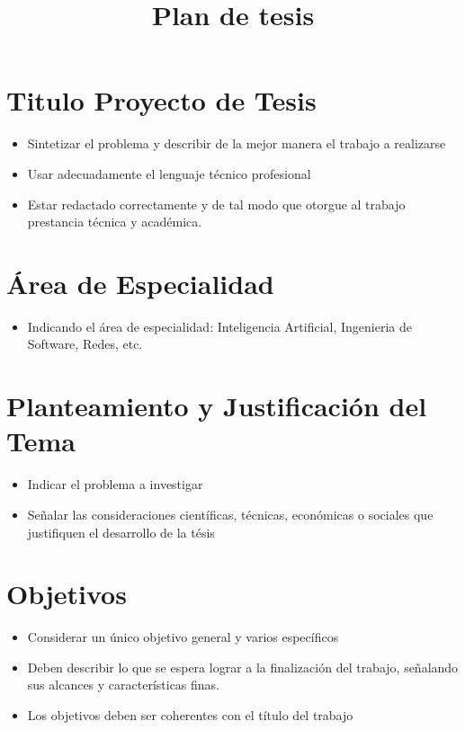 \documentclass[a4paper,11pt]{article}
\title{Plan de tesis}
\begin{document}
 
 \maketitle
 
 \section{Titulo Proyecto de Tesis}
\begin{itemize}
	\item Sintetizar el problema y describir de la mejor manera el trabajo a realizarse
	\item Usar adecuadamente el lenguaje técnico profesional
	\item Estar redactado correctamente y de tal modo que otorgue al trabajo prestancia técnica y académica.
\end{itemize}

 \section{Área de Especialidad}

\begin{itemize}
	\item Indicando el área de especialidad: Inteligencia Artificial, Ingenieria de Software, Redes, etc.
\end{itemize}
 
 \section{Planteamiento y Justificación del Tema}
\begin{itemize}
	\item Indicar el problema a investigar
	\item Señalar las consideraciones científicas, técnicas, económicas o sociales que justifiquen el desarrollo de la tésis
\end{itemize}
  
 \section{Objetivos}
\begin{itemize}
	\item Considerar un único objetivo general  y varios específicos 
	\item Deben describir lo que se espera lograr a la finalización del trabajo, señalando sus alcances y características finas.
	\item Los objetivos deben ser coherentes con el título del trabajo
\end{itemize}
\end{document}
